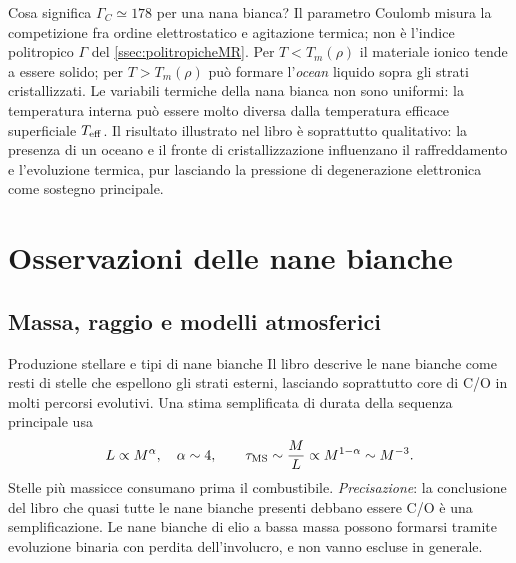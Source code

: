 \begin{frame}[t]{Cosa significa $\Gamma_C\simeq178$ per una nana bianca?}
\small
Il parametro Coulomb misura la competizione fra ordine elettrostatico e agitazione termica; non è l'indice politropico $\Gamma$ del \ref{ssec:politropicheMR}.
\medskip
Per $T<T_m(\rho)$ il materiale ionico tende a essere solido; per $T>T_m(\rho)$ può formare l'\emph{ocean} liquido sopra gli strati cristallizzati.
\medskip
Le variabili termiche della nana bianca non sono uniformi: la temperatura interna può essere molto diversa dalla temperatura efficace superficiale $T_{\rm eff}$.
\medskip
Il risultato illustrato nel libro è soprattutto qualitativo: la presenza di un oceano e il fronte di cristallizzazione influenzano il raffreddamento e l'evoluzione termica, pur lasciando la pressione di degenerazione elettronica come sostegno principale.
\end{frame}

\section{Osservazioni delle nane bianche}

\subsection{Massa, raggio e modelli atmosferici}\label{ssec:MRatmo}

\begin{frame}[t]{Produzione stellare e tipi di nane bianche}
\small
Il libro descrive le nane bianche come resti di stelle che espellono gli strati esterni, lasciando soprattutto core di C/O in molti percorsi evolutivi.
\medskip
Una stima semplificata di durata della sequenza principale usa
\[
L\propto M^\alpha,\quad\alpha\sim4,\qquad
\tau_{\rm MS}\sim\frac ML\propto M^{1-\alpha}\sim M^{-3}.
\]
Stelle più massicce consumano prima il combustibile.
\medskip
\emph{Precisazione}: la conclusione del libro che quasi tutte le nane bianche presenti debbano essere C/O è una semplificazione. Le nane bianche di elio a bassa massa possono formarsi tramite evoluzione binaria con perdita dell'involucro, e non vanno escluse in generale.
\end{frame}

